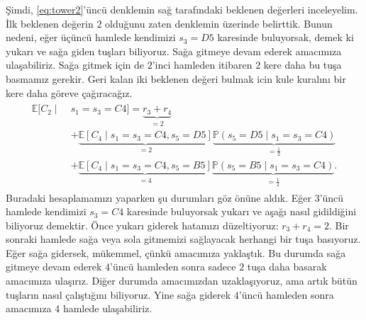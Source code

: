 \c{S}imdi, \eqref{eq:tower2}'\"{u}nc\"{u} denklemin sa\u{g} taraf{\i}ndaki
beklenen de\u{g}erleri inceleyelim. \.Ilk beklenen de\u{g}erin $2$ oldu\u{g}unu
zaten denklemin \"{u}zerinde belirttik. Bunun nedeni, e\u{g}er
\"u\c{c}\"{u}nc\"{u} hamlede kendimizi $s_3 = D5$ karesinde buluyorsak, demek ki
yukar{\i} ve sa\u{g}a giden tu\c{s}lar{\i} biliyoruz. Sa\u{g}a gitmeye devam
ederek amac{\i}m{\i}za ula\c{s}abiliriz. Sa\u{g}a gitmek i\c{c}in de $2$'inci
hamleden itibaren $2$ kere daha bu tu\c{s}a basmam{\i}z gerekir. Geri kalan iki
beklenen de\u{g}eri bulmak icin kule kural{\i}n{\i} bir kere daha g\"{o}reve
\c{c}a\u{g}{\i}raca\u{g}{\i}z.
%
\begin{align*}
    \begin{split}
    \mathbb{E}[C_2 \mid \; &s_1=s_3=C4] = \underbrace{r_3+r_4}_{=2} \\
    &+ \underbrace{\mathbb{E}[C_4 \mid s_1=s_3=C4, s_5=D5]}_{=2} \underbrace{\mathbb{P}(s_5=D5 \mid s_1=s_3=C4)}_{=\frac{1}{2}} \\
    &+ \underbrace{\mathbb{E}[C_4 \mid s_1=s_3=C4, s_5=B5]}_{=4} \underbrace{\mathbb{P}(s_5=B5 \mid s_1=s_3=C4)}_{=\frac{1}{2}}.
    \end{split}
\end{align*}
%
Buradaki hesaplamam{\i}z{\i} yaparken \c{s}u durumlar{\i} g\"{o}z \"{o}n\"{u}ne
ald{\i}k. E\u{g}er $3$'\"{u}nc\"{u} hamlede kendimizi $s_3=C4$ karesinde
buluyorsak yukar{\i} ve a\c{s}a\u{g}{\i} nas{\i}l gidildi\u{g}ini biliyoruz
demektir. \"{O}nce yukar{\i} giderek hatam{\i}z{\i} d\"{u}zeltiyoruz: $r_3 + r_4
= 2$. Bir sonraki hamlede sa\u{g}a veya sola gitmemizi sa\u{g}layacak herhangi
bir tu\c{s}a bas{\i}yoruz. E\u{g}er sa\u{g}a gidersek, m\"{u}kemmel,
\c{c}\"{u}nk\"{u} amac{\i}m{\i}za yakla\c{s}t{\i}k. Bu durumda sa\u{g}a gitmeye
devam ederek $4$'\"{u}nc\"{u} hamleden sonra sadece $2$ tu\c{s}a daha basarak
amac{\i}m{\i}za ula\c{s}{\i}r{\i}z. Di\u{g}er durumda amac{\i}m{\i}zdan
uzakla\c{s}{\i}yoruz, ama art{\i}k b\"{u}t\"{u}n tu\c{s}lar{\i}n nas{\i}l
\c{c}al{\i}\c{s}t{\i}\u{g}{\i}n{\i} biliyoruz. Yine sa\u{g}a giderek
$4$'\"{u}nc\"{u} hamleden sonra amac{\i}m{\i}za $4$ hamlede ula\c{s}abiliriz.

